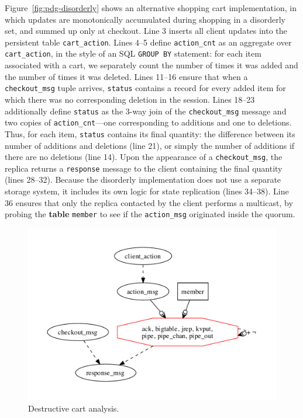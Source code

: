 Figure~\ref{fig:pdg-disorderly} shows an alternative shopping cart implementation, in which
updates are monotonically accumulated during shopping in a disorderly set, and summed up
only at checkout.  Line 3 inserts all client updates into the persistent table
\texttt{cart\_action}.  Lines 4--5 define \texttt{action\_cnt} as an aggregate
over \texttt{cart\_action}, in the style of an SQL \texttt{GROUP BY} statement: for each
item associated with a cart, we separately count the number of times it was
added and the number of times it was deleted.   
Lines 11--16 ensure that when a \texttt{checkout\_msg} tuple arrives, \texttt{status} 
contains a record for every added item
for which there was no corresponding deletion in the session.  Lines 18--23 
additionally define \texttt{status} as the 3-way join of the \texttt{checkout\_msg}
message and two copies of \texttt{action\_cnt}---one corresponding to additions and one to
deletions.
Thus, for each item, \texttt{status} contains its final quantity: the
difference between its number of additions and deletions (line 21), or simply the number
of additions if there are no deletions (line 14). 
Upon the appearance of a \texttt{checkout\_msg}, the
replica returns a \texttt{response} message to the client containing the
final quantity (lines 28--32).  
Because the disorderly implementation does not use a separate
storage system, it includes its own logic for state replication (lines 34--38).
Line 36 ensures that only the replica contacted by the client performs a multicast,
by probing the \textbf{table} \texttt{member} to see if the \texttt{action\_msg} 
originated inside the quorum.

\begin{figure}[t]
\centering
\includegraphics[width=0.9\linewidth]{fig/destructive.pdf}
\vspace{-10pt}
\caption{Destructive cart analysis.}
\label{fig:pdg-destructive-analysis}
\vspace{-2pt}
\end{figure}

